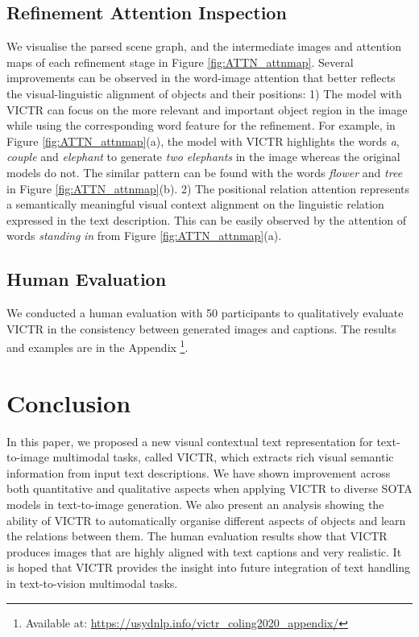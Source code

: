 \documentclass[11pt]{article}
\begin{document}
\subsection{Refinement Attention Inspection}
We visualise the parsed scene graph, and the intermediate images and attention maps of each refinement stage in Figure \ref{fig:ATTN_attnmap}. Several improvements can be observed in the word-image attention that better reflects the visual-linguistic alignment of objects and their positions: 1) The model with VICTR can focus on the more relevant and important object region in the image while using the corresponding word feature for the refinement. For example, in Figure \ref{fig:ATTN_attnmap}(a), the model with VICTR highlights the words \textit{a}, \textit{couple} and \textit{elephant} to generate \textit{two elephants} in the image whereas the original models do not. The similar pattern can be found with the words \textit{flower} and \textit{tree} in Figure \ref{fig:ATTN_attnmap}(b). 2) The positional relation attention represents a semantically meaningful visual context alignment on the linguistic relation expressed in the text description. This can be easily observed by the attention of words \textit{standing} \textit{in} from Figure \ref{fig:ATTN_attnmap}(a).

\subsection{Human Evaluation}
We conducted a human evaluation with 50 participants to qualitatively evaluate VICTR in the consistency between generated images and captions. The results and examples are in the Appendix \footnote{Available at: \url{https://usydnlp.info/victr_coling2020_appendix/}}.


\section{Conclusion}
In this paper, we proposed a new visual contextual text representation for text-to-image multimodal tasks, called VICTR, which extracts rich visual semantic information from input text descriptions. We have shown improvement across both quantitative and qualitative aspects when applying VICTR to diverse SOTA models in text-to-image generation. We also present an analysis showing the ability of VICTR to automatically organise different aspects of objects and learn the relations between them. The human evaluation results show that VICTR produces images that are highly aligned with text captions and very realistic. It is hoped that VICTR provides the insight into future integration of text handling in text-to-vision multimodal tasks.









\end{document}
